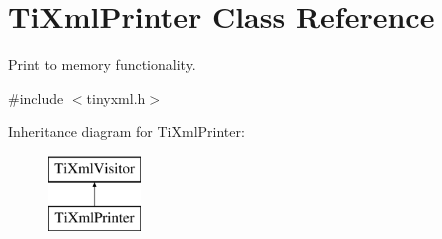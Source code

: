\hypertarget{class_ti_xml_printer}{
\section{TiXmlPrinter Class Reference}
\label{class_ti_xml_printer}
}


Print to memory functionality.  




{\ttfamily \#include $<$tinyxml.h$>$}

Inheritance diagram for TiXmlPrinter:\begin{figure}[H]
\begin{center}
\leavevmode
\includegraphics[height=2.000000cm]{class_ti_xml_printer}
\end{center}
\end{figure}
